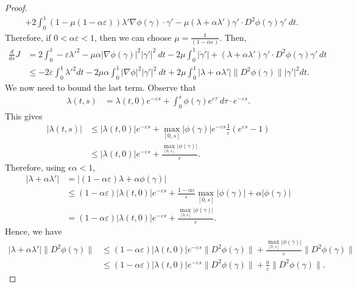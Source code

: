\documentclass[12pt]{amsart}
\theoremstyle{definition}
\theoremstyle{remark}
\numberwithin{equation}{section}
\numberwithin{equation}{section}
\begin{document}
\begin{proof}
\begin{align*}
    &+ 2 \int_0^1 (1-\mu(1-\alpha\varepsilon))\lambda'\nabla\phi(\gamma)\cdot \gamma'-\mu(\lambda+\alpha\lambda')\gamma' \cdot D^2\phi(\gamma)\gamma'~dt.
\end{align*} 
Therefore, if $0<\alpha\varepsilon < 1$, then we can choose $\mu = \frac{1}{(1-\alpha\varepsilon)}$. Then, 
\begin{align*}
    \frac{d}{ds} J & = 2 \int_0^1-\varepsilon\lambda'^2-\mu\alpha |\nabla\phi(\gamma)|^2|\gamma'|^2~dt - 2 \mu\int_0^1|\dot{\gamma}'|+(\lambda+\alpha\lambda')\gamma' \cdot D^2\phi(\gamma)\gamma'~dt \\
    & \leq -2 \varepsilon \int_0^1\lambda'^2dt -2\mu\alpha  \int_0^1 |\nabla \phi|^2 |\gamma'|^2~dt + 2\mu \int_0^1 
    |\lambda +\alpha \lambda'| \|D^2\phi(\gamma)\||\gamma'|^2 dt. 
\end{align*}
We now need to bound the last term. Observe that 
\begin{align*}
    \lambda(t,s) &= \lambda(t,0)e^{-\varepsilon s} + \int_0^s\phi(\gamma)e^{\varepsilon \tau}~d\tau \cdot e^{-\varepsilon s}.
 \end{align*} 
 This gives 
 \begin{align*} 
   |\lambda(t,s)|  
    & \leq |\lambda(t,0)|e^{-\varepsilon s} +\max_{[0, s]} |\phi(\gamma)|e^{-\varepsilon s} \frac{1}{\varepsilon}(e^{\varepsilon s} - 1)\\
    & \leq |\lambda(t,0)|e^{-\varepsilon s} +\frac{ \max_{[0, s]} |\phi(\gamma)|}{\varepsilon}. 
\end{align*}
Therefore, using $\epsilon \alpha <1$,  
\begin{align*}
    |\lambda + \alpha \lambda'| &= |(1-\alpha\varepsilon)\lambda +\alpha\phi(\gamma)|\\
    &\leq (1-\alpha\varepsilon) |\lambda(t,0)|e^{-\varepsilon s}+ \frac{1-\alpha\varepsilon}{\varepsilon} \max_{[0, s]} |\phi(\gamma)|+\alpha|\phi(\gamma)|\\
    & = (1-\alpha\varepsilon) |\lambda(t,0)|e^{-\varepsilon s} +\frac{\max_{[0, s]} |\phi(\gamma)|}{\varepsilon}.
\end{align*}
Hence, we have 
\begin{align*}
    |\lambda +\alpha \lambda'|\|D^2 \phi(\gamma)\|  & \leq (1-\alpha\varepsilon) |\lambda(t,0)|e^{-\varepsilon s} \|D^2 \phi(\gamma)\| + \frac{\max_{[0, s]} |\phi(\gamma)|}{\varepsilon}   
    \|D^2 \phi(\gamma)\| \\
    & \leq (1-\alpha\varepsilon) |\lambda(t,0)|e^{-\varepsilon s} \|D^2 \phi(\gamma)\| + \frac{a}{\varepsilon} \|D^2 \phi(\gamma)\|.

\end{align*}
\end{proof}
\end{document}
